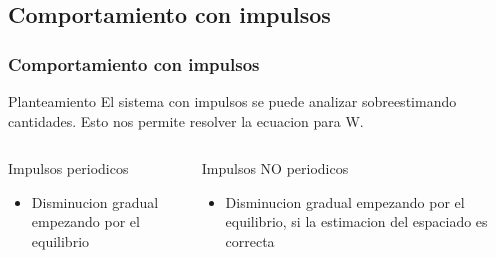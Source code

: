 \documentclass{beamer}
\begin{document}
\subsection{Comportamiento con impulsos}
\begin{frame}
	\frametitle{Comportamiento con impulsos}
	\begin{block}{Planteamiento}
		El sistema con impulsos se puede analizar sobreestimando cantidades. Esto nos permite resolver la ecuacion para W.
	\end{block}
	\begin{columns}[t]
		
		\begin{block}{Impulsos periodicos}
		\begin{itemize}
			\item Disminucion gradual empezando por el equilibrio
		\end{itemize}
	\end{block}
		\begin{block}{Impulsos NO periodicos}
		\begin{itemize}
			\item Disminucion gradual empezando por el equilibrio, si la estimacion del espaciado es correcta
		\end{itemize}
	\end{block}
	\end{columns}
	
\end{frame}
\end{document}
